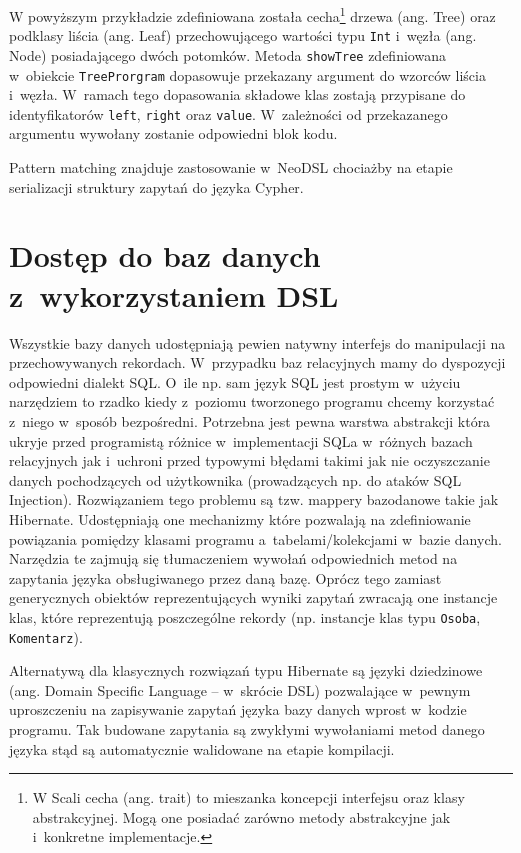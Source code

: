 \documentclass[brudnopis]{xmgr}
\begin{document}
W powyższym przykładzie zdefiniowana została cecha\footnote{W Scali cecha (ang. trait) to mieszanka koncepcji interfejsu oraz klasy abstrakcyjnej. Mogą one posiadać zarówno metody abstrakcyjne jak i~konkretne implementacje.} drzewa (ang. Tree) oraz podklasy liścia (ang. Leaf) przechowującego wartości typu \texttt{Int} i~węzła (ang. Node) posiadającego dwóch potomków. Metoda \texttt{showTree} zdefiniowana w~obiekcie \texttt{TreeProrgram} dopasowuje przekazany argument do wzorców liścia i~węzła. W~ramach tego dopasowania składowe klas zostają przypisane do identyfikatorów \texttt{left}, \texttt{right} oraz \texttt{value}. W~zależności od przekazanego argumentu wywołany zostanie odpowiedni blok kodu.

Pattern matching znajduje zastosowanie w~NeoDSL chociażby na etapie serializacji struktury zapytań do języka Cypher.

\chapter{Dostęp do baz danych z~wykorzystaniem DSL}

Wszystkie bazy danych udostępniają pewien natywny interfejs do manipulacji na przechowywanych rekordach. W~przypadku baz relacyjnych mamy do dyspozycji odpowiedni dialekt SQL. O~ile np. sam język SQL jest prostym w~użyciu narzędziem to rzadko kiedy z~poziomu tworzonego programu chcemy korzystać z~niego w~sposób bezpośredni. Potrzebna jest pewna warstwa abstrakcji która ukryje przed programistą różnice w~implementacji SQLa w~różnych bazach relacyjnych jak i~uchroni przed typowymi błędami takimi jak nie oczyszczanie danych pochodzących od użytkownika (prowadzących np. do ataków SQL Injection). Rozwiązaniem tego problemu są tzw. mappery bazodanowe takie jak Hibernate. Udostępniają one mechanizmy które pozwalają na zdefiniowanie powiązania pomiędzy klasami programu a~tabelami/kolekcjami w~bazie danych. Narzędzia te zajmują się tłumaczeniem wywołań odpowiednich metod na zapytania języka obsługiwanego przez daną bazę. Oprócz tego zamiast generycznych obiektów reprezentujących wyniki zapytań zwracają one instancje klas, które reprezentują poszczególne rekordy (np. instancje klas typu \texttt{Osoba}, \texttt{Komentarz}).

Alternatywą dla klasycznych rozwiązań typu Hibernate są języki dziedzinowe (ang. Domain Specific Language -- w~skrócie DSL)  pozwalające w~pewnym uproszczeniu na zapisywanie zapytań języka bazy danych wprost w~kodzie programu. Tak budowane zapytania są zwykłymi wywołaniami metod danego języka stąd są automatycznie walidowane na etapie kompilacji.
\end{document}
